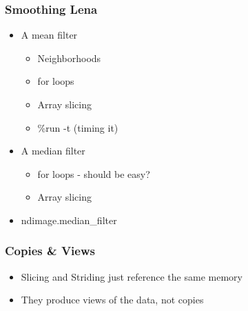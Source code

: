\documentclass[presentation]{beamer}
\begin{document}
\begin{frame}
\frametitle{Smoothing Lena}
\label{sec-3_2}
\begin{itemize}

\item A mean filter
\label{sec-3_2_1}%
\begin{itemize}

\item Neighborhoods\\
\label{sec-3_2_1_1}%
\item for loops\\
\label{sec-3_2_1_2}%
\item Array slicing\\
\label{sec-3_2_1_3}%
\item \%run -t (timing it)\\
\label{sec-3_2_1_4}%
\end{itemize} %

\item A median filter
\label{sec-3_2_2}%
\begin{itemize}

\item for loops - should be easy?\\
\label{sec-3_2_2_1}%
\item Array slicing\\
\label{sec-3_2_2_2}%
\end{itemize} %

\item ndimage.median\_filter\\
\label{sec-3_2_3}%
\end{itemize} %
\end{frame}
\begin{frame}
\frametitle{Copies \& Views}
\label{sec-3_3}

\begin{itemize}
\item Slicing and Striding just reference the same memory
\item They produce views of the data, not copies
\end{itemize}
\end{frame}
\end{document}
